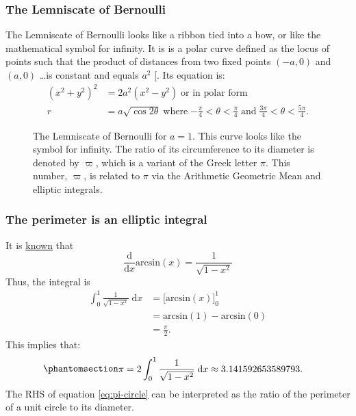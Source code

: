 \documentclass[
  a4paper,
]{article}
\begin{document}
\subsubsection{The Lemniscate of
Bernoulli}\label{the-lemniscate-of-bernoulli}

The Lemniscate of Bernoulli looks like a ribbon tied into a bow, or like
the mathematical symbol for infinity. It is is a polar curve defined as
the locus of points such that the product of distances from two fixed
points \((-a, 0)\) and \((a, 0)\) \ldots is constant and equals \(a^2\)
{[}\citeproc{ref-lemniscate-mathworld}{34}{]}. Its equation is: \[
\begin{aligned}
(x^2 + y^2)^2 &= 2a^2(x^2 - y^2)\; \text{or in polar form}\\
r &= a\sqrt{\cos2\theta} \; \text{where}\; \textstyle{-\frac{\pi}{4} < \theta < \frac{\pi}{4}\; \text{and}\; \frac{3\pi}{4} < \theta < \frac{5\pi}{4}}.
\end{aligned}
\]

\begin{figure}
\centering

\caption{The Lemniscate of Bernoulli for \(a = 1\). This curve looks
like the symbol for infinity. The ratio of its circumference to its
diameter is denoted by \(\varpi\), which is a variant of the Greek
letter \(\pi\). This number, \(\varpi\), is related to \(\pi\) via the
Arithmetic Geometric Mean and elliptic integrals.}\label{fig:lemniscate}
\end{figure}

\subsubsection{The perimeter is an elliptic
integral}\label{the-perimeter-is-an-elliptic-integral}

It is
\href{https://ocw.mit.edu/courses/18-01sc-single-variable-calculus-fall-2010/857933bc947b1ed184c79a5710fc86bc_MIT18_01SCF10_Ses15c.pdf}{known}
that \[
\frac{\mathrm{d}}{\mathrm{d}x} \mathrm{​arcsin}(x) = \frac{1}{\sqrt{1 - x^2}}
\] Thus, the integral is \[
\begin{aligned}
\int_0^1 \frac{1}{\sqrt{1 - x^2}}\;\mathrm{d}x &= \bigl[\mathrm{arcsin}(x)\bigr]_0^1\\
&= \mathrm{arcsin}(1) - \mathrm{arcsin}(0)\\
&= \frac{\pi}{2}.
\end{aligned}
\] This implies that:
\begin{equation}\phantomsection\label{eq:pi-circle}{
\begin{aligned}
\pi &= 2\int_0^1 \frac{1}{\sqrt{1 - x^2}}\;\mathrm{d}x \approx 3.141592653589793.
\end{aligned}
}\end{equation} The RHS of equation \cref{eq:pi-circle} can be
interpreted as the ratio of the perimeter of a unit circle to its
diameter.
\end{document}
